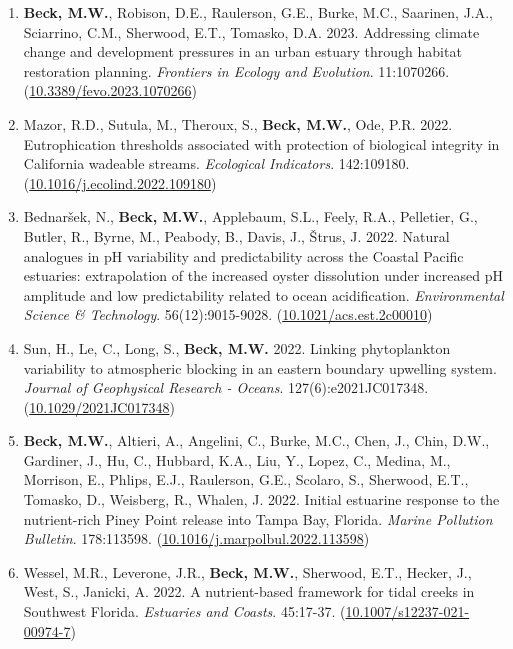 \documentclass[letterpaper,12pt]{article}
\begin{document}
\begin{enumerate}
\item \textbf{Beck, M.W.}, Robison, D.E., Raulerson, G.E., Burke, M.C., Saarinen, J.A., Sciarrino, C.M., Sherwood, E.T., Tomasko, D.A. 2023. Addressing climate change and development pressures in an urban estuary through habitat restoration planning. \textit{Frontiers in Ecology and Evolution}. 11:1070266. ({\footnotesize\href{https://doi.org/10.3389/fevo.2023.1070266}{10.3389/fevo.2023.1070266}})

\item Mazor, R.D., Sutula, M., Theroux, S., \textbf{Beck, M.W.}, Ode, P.R. 2022. Eutrophication thresholds associated with protection of biological integrity in California wadeable streams. \textit{Ecological Indicators}. 142:109180. ({\footnotesize\href{https://doi.org/10.1016/j.ecolind.2022.109180}{10.1016/j.ecolind.2022.109180}})

\item Bednar\v{s}ek, N., \textbf{Beck, M.W.}, Applebaum, S.L., Feely, R.A., Pelletier, G., Butler, R., Byrne, M., Peabody, B., Davis, J., \v{S}trus, J. 2022. Natural analogues in p{H} variability and predictability across the {C}oastal {P}acific estuaries: extrapolation of the increased oyster dissolution under increased p{H} amplitude and low predictability related to ocean acidification. \textit{Environmental Science \& Technology}. 56(12):9015-9028. ({\footnotesize\href{https://doi.org/10.1021/acs.est.2c00010}{10.1021/acs.est.2c00010}})

\item Sun, H., Le, C., Long, S., \textbf{Beck, M.W.} 2022. Linking phytoplankton variability to atmospheric blocking in an eastern boundary upwelling system. \textit{Journal of Geophysical Research - Oceans}. 127(6):e2021JC017348. ({\footnotesize\href{https://doi.org/10.1029/2021JC017348}{10.1029/2021JC017348}})

\item \textbf{Beck, M.W.}, Altieri, A., Angelini, C., Burke, M.C., Chen, J., Chin, D.W., Gardiner, J., Hu, C., Hubbard, K.A., Liu, Y., Lopez, C., Medina, M., Morrison, E., Phlips, E.J., Raulerson, G.E., Scolaro, S., Sherwood, E.T., Tomasko, D., Weisberg, R., Whalen, J. 2022. Initial estuarine response to the nutrient-rich Piney Point release into Tampa Bay, Florida. \textit{Marine Pollution Bulletin}. 178:113598. ({\footnotesize\href{https://doi.org/10.1016/j.marpolbul.2022.113598}{10.1016/j.marpolbul.2022.113598}})

\item Wessel, M.R., Leverone, J.R., \textbf{Beck, M.W.}, Sherwood, E.T., Hecker, J., West, S., Janicki, A. 2022. A nutrient-based framework for tidal creeks in Southwest Florida. \textit{Estuaries and Coasts}. 45:17-37. ({\footnotesize\href{https://doi.org/10.1007/s12237-021-00974-7}{10.1007/s12237-021-00974-7}})


\end{enumerate}
\end{document}
